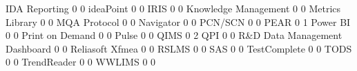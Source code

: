 \documentclass{article}
\begin{document}
\begin{Schunk}
\begin{Soutput}
  IDA Reporting                                                        0   0
  ideaPoint                                                            0   0
  IRIS                                                                 0   0
  Knowledge Management                                                 0   0
  Metrics Library                                                      0   0
  MQA Protocol                                                         0   0
  Navigator                                                            0   0
  PCN/SCN                                                              0   0
  PEAR                                                                 0   1
  Power BI                                                             0   0
  Print on Demand                                                      0   0
  Pulse                                                                0   0
  QIMS                                                                 0   2
  QPI                                                                  0   0
  R&D Data Management Dashboard                                        0   0
  Reliasoft Xfmea                                                      0   0
  RSLMS                                                                0   0
  SAS                                                                  0   0
  TestComplete                                                         0   0
  TODS                                                                 0   0
  TrendReader                                                          0   0
  WWLIMS                                                               0   0
                                                           

\end{Soutput}
\end{Schunk}
\end{document}
